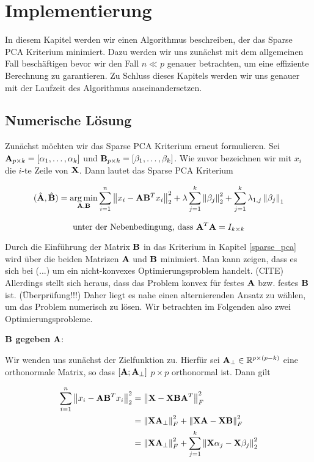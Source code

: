 \chapter{Implementierung}

\label{implementation}

In diesem Kapitel werden wir einen Algorithmus beschreiben, der das Sparse PCA Kriterium minimiert. Dazu werden wir uns zunächst mit dem allgemeinen Fall beschäftigen bevor wir den Fall $n \ll p$ genauer betrachten, um eine effiziente Berechnung zu garantieren. Zu Schluss dieses Kapitels werden wir uns genauer mit der Laufzeit des Algorithmus auseinandersetzen. 

\section{Numerische Lösung}

Zunächst möchten wir das Sparse PCA Kriterium erneut formulieren. Sei $\mathbf{A}_{p \times k} = [ \alpha_1, \ldots ,\alpha_k ]$ und $\mathbf{B}_{p \times k} = [ \beta_1, \ldots ,\beta_k ]$. Wie zuvor bezeichnen wir mit $x_i$ die $i$-te Zeile von $\mathbf{X}$. Dann lautet das Sparse PCA Kriterium

$$(\hat{\mathbf{A}}, \hat{\mathbf{B}}) = \operatorname*{arg\,min}_{\mathbf{A}, \mathbf{B}} \sum_{i=1}^{n} \left\lVert x_i - \mathbf{A}\mathbf{B}^Tx_i \right\rVert_2^2 + \lambda \sum_{j=1}^{k}\left\lVert \beta_j \right\rVert_2^2 + \sum_{j=1}^k \lambda_{1,j} \left\lVert \beta_j \right\rVert_1$$

$$\text{unter der Nebenbedingung, dass } \mathbf{A}^T\mathbf{A} = I_{k \times k}$$

Durch die Einführung der Matrix $\mathbf{B}$ in das Kriterium in Kapitel \ref{sparse_pca} wird über die beiden Matrizen $\mathbf{A}$ und $\mathbf{B}$ minimiert. Man kann zeigen, dass es sich bei (...) um ein nicht-konvexes Optimierungsproblem handelt. (CITE) Allerdings stellt sich heraus, dass das Problem konvex für festes $\mathbf{A}$ bzw. festes $\mathbf{B}$ ist. (Überprüfung!!!) Daher liegt es nahe einen alternierenden Ansatz zu wählen, um das Problem numerisch zu lösen. Wir betrachten im Folgenden also zwei Optimierungsprobleme.

$\mathbf{B}$ \textbf{gegeben} $\mathbf{A}$:

Wir wenden uns zunächst der Zielfunktion zu. Hierfür sei $\mathbf{A}_{\perp} \in \mathbb{R}^{p \times (p-k)}$ eine orthonormale Matrix, so dass $[\mathbf{A} ; \mathbf{A}_{\perp}]$ $p \times p$ orthonormal ist. Dann gilt

\begin{align*}
\sum_{i=1}^{n} \left\lVert x_i - \mathbf{A}\mathbf{B}^Tx_i \right\rVert_2^2 & = \left\lVert \mathbf{X} - \mathbf{X} \mathbf{B} \mathbf{A}^T \right\rVert_F^{2}\\
& = \left\lVert \mathbf{X} \mathbf{A}_{\perp} \right\rVert_F^2 + \left\lVert \mathbf{X} \mathbf{A} - \mathbf{X} \mathbf{B} \right\rVert_F^2\\
& = \left\lVert \mathbf{X} \mathbf{A}_{\perp} \right\rVert_F^2 + \sum_{j=1}^{k}\left\lVert \mathbf{X} \alpha_j - \mathbf{X}\beta_j \right\rVert_2^2
\end{align*}

